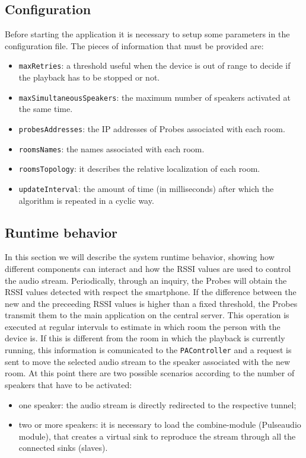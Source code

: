 \documentclass[conference]{IEEEtran}
\begin{document}
\subsection{Configuration}
Before starting the application it is necessary to setup some parameters in the configuration file. The pieces of information that must be provided are:
\begin{itemize}
\item \texttt{maxRetries}: a threshold useful when the device is out of range to decide if the playback has to be stopped or not.
\item \texttt{maxSimultaneousSpeakers}: the maximum number of speakers activated at the same time.
\item \texttt{probesAddresses}: the IP addresses of Probes associated with each room.
\item \texttt{roomsNames}: the names associated with each room.
\item \texttt{roomsTopology}: it describes the relative localization of each room. %
\item \texttt{updateInterval}: the amount of time (in milliseconds) after which the algorithm is repeated in a cyclic way.
\end{itemize}

\subsection{Runtime behavior}
In this section we will describe the system runtime behavior, showing how different components can interact and how the RSSI values are used to control the audio stream.
Periodically, through an inquiry, the Probes will obtain the RSSI values detected with respect the smartphone. If the difference between the new and the preceeding RSSI values is higher than a fixed threshold, the Probes transmit them to the main application on the central server. This operation is executed at regular intervals to estimate in which room the person with the device is. If this is different from the room in which the playback is currently running, this information is comunicated to the \texttt{PAController} and a request is sent to move the selected audio stream to the speaker associated with the new room. At this point there are two possible scenarios according to the number of speakers that have to be activated:
\begin{itemize}
\item one speaker: the audio stream is directly redirected to the respective tunnel;
\item two or more speakers: it is necessary to load the combine-module (Pulseaudio module), that creates a virtual sink to reproduce the stream through all the connected sinks (slaves).
\end{itemize}
\end{document}
